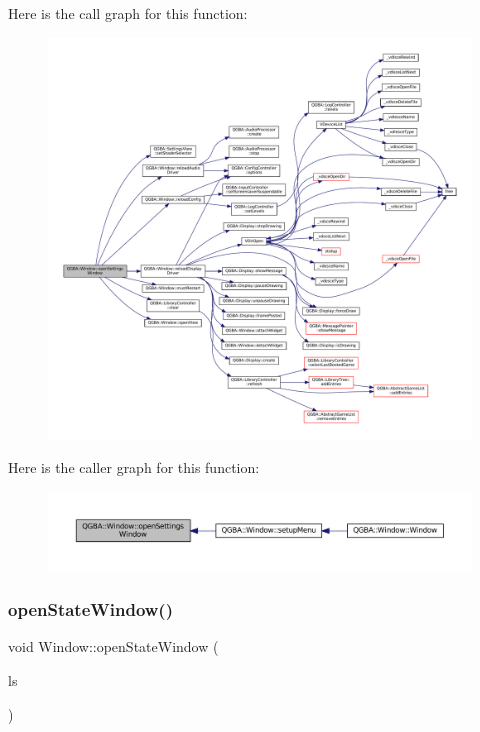 Here is the call graph for this function\+:
\nopagebreak
\begin{figure}[H]
\begin{center}
\leavevmode
\includegraphics[width=350pt]{class_q_g_b_a_1_1_window_acf3797e7d048f6e0bda1e3a576b106f2_cgraph}
\end{center}
\end{figure}
Here is the caller graph for this function\+:
\nopagebreak
\begin{figure}[H]
\begin{center}
\leavevmode
\includegraphics[width=350pt]{class_q_g_b_a_1_1_window_acf3797e7d048f6e0bda1e3a576b106f2_icgraph}
\end{center}
\end{figure}
\mbox{\label{class_q_g_b_a_1_1_window_a830974740cbfbd017c09eeb45df41c04}} 
\subsubsection{\texorpdfstring{open\+State\+Window()}{openStateWindow()}}
{\footnotesize\ttfamily void Window\+::open\+State\+Window (\begin{DoxyParamCaption}\item[{\mbox{\hyperlink{namespace_q_g_b_a_a7943e4735d6f412e1479e456e6f4aca2}{Load\+Save}}}]{ls }\end{DoxyParamCaption})\hspace{0.3cm}{\ttfamily [private]}}

